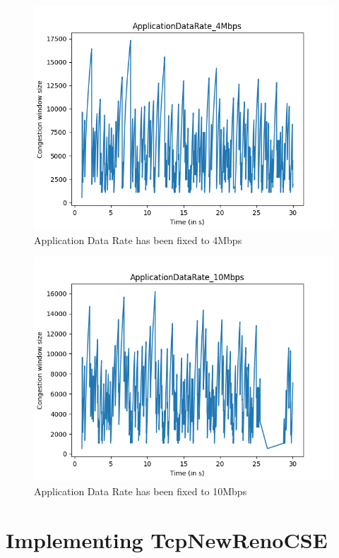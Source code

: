 \documentclass{article}
\begin{document}
\begin{figure}[H]
    \centering
    \includegraphics[scale = 0.8]{Q2/outputs/plots/ApplicationDataRate_4Mbps.png}
    \caption{Application Data Rate has been fixed to 4Mbps}
\end{figure}

\begin{figure}[H]
    \centering
    \includegraphics[scale = 0.8]{Q2/outputs/plots/ApplicationDataRate_10Mbps.png}
    \caption{Application Data Rate has been fixed to 10Mbps}
\end{figure}


\section{Implementing TcpNewRenoCSE}
\end{document}
